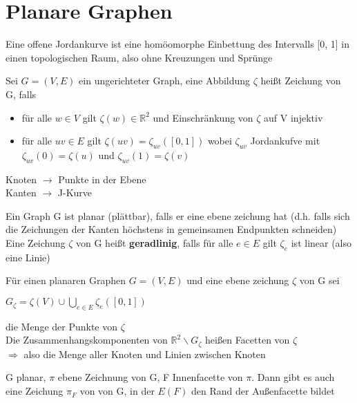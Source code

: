 \documentclass[14pt]{article}
\begin{document}
\section{Planare Graphen}
\begin{definition} 
    Eine offene Jordankurve ist eine homöomorphe Einbettung
    des Intervalls [0, 1] in einen topologischen Raum, also 
    ohne Kreuzungen und Sprünge
\end{definition}
\begin{definition}
    Sei $G = (V, E)$ ein ungerichteter Graph, eine Abbildung $\zeta$
    heißt Zeichung von G, falls
    \begin{itemize}
        \item für alle $w \in V$ gilt $\zeta(w) \in \mathbb{R}^2$ und 
        Einschränkung von $\zeta$ auf V injektiv
        \item für alle $uv \in E$ gilt $\zeta(uv) = \zeta_{uv}([0, 1])$
        wobei $\zeta_{uv}$ Jordankufve mit $\zeta_{uv}(0) = \zeta(u)$ und
        $\zeta_{uv}(1) = \zeta(v)$
    \end{itemize} 
    Knoten $\rightarrow$ Punkte in der Ebene \\
    Kanten $\rightarrow$ J-Kurve
\end{definition}
\begin{definition} [Planar]
    Ein Graph G ist planar (plättbar), falls er eine ebene zeichung hat
    (d.h. falls sich die Zeichungen der Kanten höchstens in gemeinsamen
    Endpunkten schneiden) \\
    Eine Zeichung $\zeta$ von G heißt \textbf{geradlinig}, falls für
    alle $e \in E$ gilt $\zeta_e$ ist linear (also eine Linie)
\end{definition}
\begin{definition}
    Für einen planaren Graphen $G = (V, E)$ und eine ebene zeichung $\zeta$ von 
    G sei \\
    \begin{center}
        $G_{\zeta} = \zeta(V) \cup \bigcup_{e \in E} \zeta_e([0, 1])$
    \end{center}
    die Menge der Punkte von $\zeta$ \\
    Die Zusammenhangskomponenten von $\mathbb{R}^2 \backslash G_{\zeta}$ heißen
    Facetten von $\zeta$ \\
    $\Rightarrow$ also die Menge aller Knoten und Linien zwischen Knoten
\end{definition}
\begin{eigenschaft}
    G planar, $\pi$ ebene Zeichnung von G, F Innenfacette von $\pi$. Dann gibt es auch
    eine Zeichung $\pi_F$ von von G, in der $E(F)$ den Rand der Außenfacette bildet
\end{eigenschaft}
\end{document}
